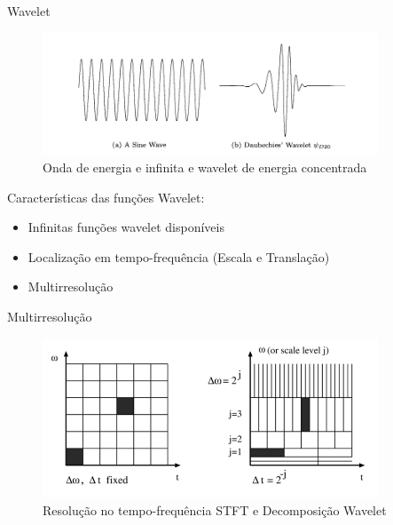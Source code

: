 \documentclass[10pt]{beamer}
\begin{document}
\begin{frame}{Wavelet}
   {
      \begin{figure}[]
        \centering
        \includegraphics[width=10cm]{images/waveAndWavelet.png}
        \caption{Onda de energia e infinita e wavelet de energia concentrada}
      \end{figure}
    }

     {
      Características das funções Wavelet:
      \begin{itemize}
        \item Infinitas funções wavelet disponíveis
        \item Localização em tempo-frequência (Escala e Translação)
        \item Multirresolução
      \end{itemize}
    }
\end{frame}

\begin{frame}{Multirresolução}

  \begin{figure}[]
    \centering
    \includegraphics[width=10cm]{images/multiresolution.png}
    \caption{Resolução no tempo-frequência STFT e Decomposição Wavelet}
  \end{figure}

\end{frame}
\end{document}
